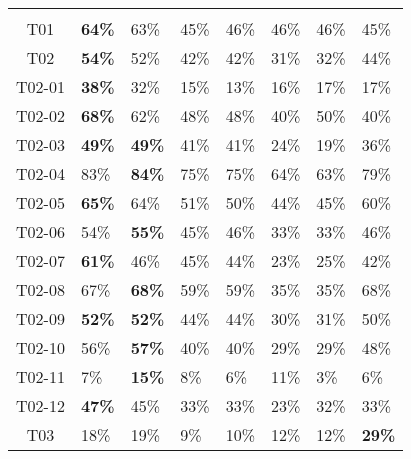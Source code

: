 \begin{table}[!h]
    \setlength\tabcolsep{4pt}
    \begin{tabularx}{\textwidth}{c*{7}{Z}}
        \toprule
        \midrule
         &  &  &  &
         &  &  & \\
        T01 & \textbf{64\%} & 63\% & 45\% & 46\% & 46\% & 46\% & 45\%\\
        T02 & \textbf{54\%} & 52\% & 42\% & 42\% & 31\% & 32\% & 44\%\\
        T02-01 & \textbf{38\%} & 32\% & 15\% & 13\% & 16\% & 17\% & 17\%\\
        T02-02 & \textbf{68\%} & 62\% & 48\% & 48\% & 40\% & 50\% & 40\%\\
        T02-03 & \textbf{49\%} & \textbf{49\%} & 41\% & 41\% & 24\% & 19\% & 36\%\\
        T02-04 & 83\% & \textbf{84\%} & 75\% & 75\% & 64\% & 63\% & 79\%\\
        T02-05 & \textbf{65\%} & 64\% & 51\% & 50\% & 44\% & 45\% & 60\%\\
        T02-06 & 54\% & \textbf{55\%} & 45\% & 46\% & 33\% & 33\% & 46\%\\
        T02-07 & \textbf{61\%} & 46\% & 45\% & 44\% & 23\% & 25\% & 42\%\\
        T02-08 & 67\% & \textbf{68\%} & 59\% & 59\% & 35\% & 35\% & 68\%\\
        T02-09 & \textbf{52\%} & \textbf{52\%} & 44\% & 44\% & 30\% & 31\% & 50\%\\
        T02-10 & 56\% & \textbf{57\%} & 40\% & 40\% & 29\% & 29\% & 48\%\\
        T02-11 & 7\% & \textbf{15\%} & 8\% & 6\% & 11\% & 3\% & 6\%\\
        T02-12 & \textbf{47\%} & 45\% & 33\% & 33\% & 23\% & 32\% & 33\%\\
        T03 & 18\% & 19\% & 9\% & 10\% & 12\% & 12\% & \textbf{29\%}\\

\end{tabularx}
\end{table}

